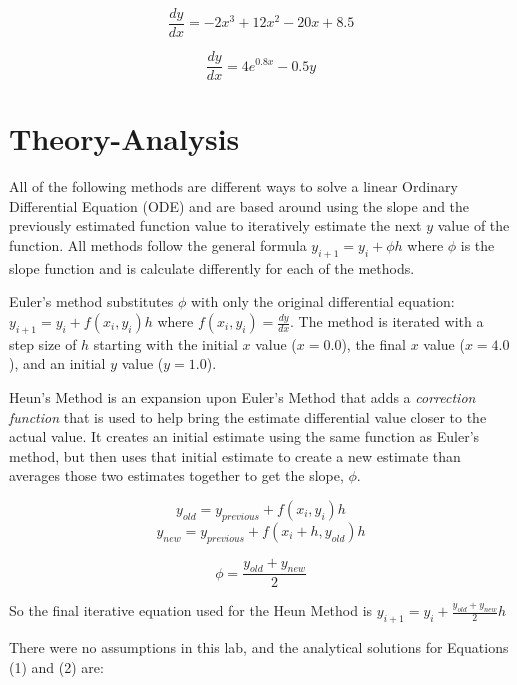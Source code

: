 \documentclass[12pt, letterpaper]{article}
\begin{document}
	  \begin{equation}\frac{dy}{dx}=-2x^3+12x^2-20x+8.5\end{equation}
	  
	  \begin{equation}\frac{dy}{dx}=4e^{0.8x}-0.5y\end{equation}

\section{\label{sec:theory}Theory-Analysis}
	All of the following methods are different ways to solve a linear Ordinary Differential Equation (ODE) and are based around using the slope and the previously estimated function value to iteratively estimate the next $y$ value of the function. All methods follow the general formula $y_{i+1}=y_i + \phi h$ where $\phi$ is the slope function and is calculate differently for each of the methods.
	
	Euler's method substitutes $\phi$ with only the original differential equation: $y_{i+1}=y_i + f(x_i, y_i) h$ where $f(x_i, y_i)=\frac{dy}{dx}$. The method is iterated with a step size of $h$ starting with the initial $x$ value ($x=0.0$), the final $x$ value ($x=4.0$), and an initial $y$ value ($y=1.0$).
	
	Heun's Method is an expansion upon Euler's Method that adds a \textit{correction function} that is used to help bring the estimate differential value closer to the actual value. It creates an initial estimate using the same function as Euler's method, but then uses that initial estimate to create a new estimate than averages those two estimates together to get the slope, $\phi$.
	
	\begin{equation}y_{old}=y_{previous} + f(x_i, y_i)h\end{equation}
	\begin{equation}y_{new} = y_{previous} + f(x_i+h, y_{old})h\end{equation}
	
	\begin{equation*}\phi=\frac{y_{old}+y_{new}}{2}\end{equation*}
	
	So the final iterative equation used for the Heun Method is $y_{i+1}=y_i+\frac{y_{old}+y_{new}}{2}h$
	
	There were no assumptions in this lab, and the analytical solutions for Equations (1) and (2) are:
	
\end{document}
